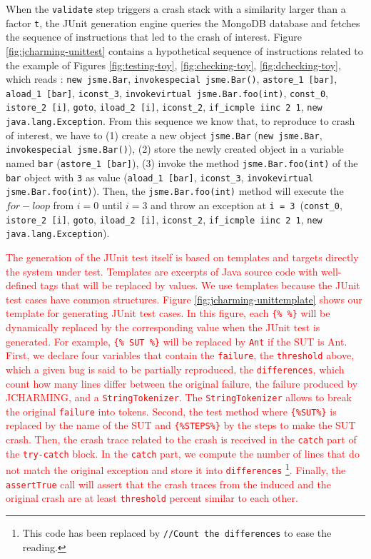 \documentclass[times, doublespace]{smrauth}
\newcommand{\red}[1]{\textcolor{red}{#1}}
\begin{document}
{When the {\tt validate} step triggers a crash stack with a similarity larger than a factor {\tt t}, the JUnit generation engine queries the MongoDB database and fetches the sequence of instructions that led to the crash of interest.
Figure \ref{fig:jcharming-unittest} contains a hypothetical sequence
of instructions related to the example of Figures \ref{fig:testing-toy},
\ref{fig:checking-toy}, \ref{fig:dchecking-toy}, which reads : {\tt new jsme.Bar},
 {\tt invokespecial jsme.Bar()}, {\tt astore\_1 [bar]}, {\tt aload\_1 [bar]},
  {\tt iconst\_3}, {\tt invokevirtual jsme.Bar.foo(int)}, {\tt const\_0},
  {\tt istore\_2 [i]}, {\tt goto}, {\tt iload\_2 [i]}, {\tt iconst\_2},
  {\tt if\_icmple iinc 2 1}, {\tt new java.lang.Exception}.
From this sequence we know that, to reproduce to crash of interest, we have
to (1) create a new object {\tt jsme.Bar} ({\tt new jsme.Bar},
{\tt invokespecial jsme.Bar()}), (2) store the newly created object in a
variable named {\tt bar} ({\tt astore\_1 [bar]}), (3) invoke the method
{\tt jsme.Bar.foo(int)} of the {\tt bar} object with {\tt 3} as value
({\tt aload\_1 [bar]}, {\tt iconst\_3}, {\tt invokevirtual jsme.Bar.foo(int)}).
Then, the {\tt jsme.Bar.foo(int)} method will execute the $for-loop$ from $i=0$ until $i=3$ and
throw an exception at {\tt i = 3}~({\tt const\_0}, {\tt istore\_2 [i]}, {\tt goto},
{\tt iload\_2 [i]}, {\tt iconst\_2}, {\tt if\_icmple iinc 2 1}, {\tt new java.lang.Exception}).

\red{The generation of the JUnit test itself is based on templates and targets directly
the system under test. Templates are excerpts of Java source code with well-defined
tags that will be replaced by values. We use templates because the
JUnit test cases have common structures.
Figure \ref{fig:jcharming-unittemplate} shows our template for generating JUnit
test cases. In this figure, each {\tt \{\% \%\}} will be dynamically replaced by
the corresponding value when the JUnit test is generated. For example, {\tt \{\% SUT \%\}}
will be replaced by {\tt Ant} if the SUT is Ant.
First, we declare four variables that contain the {\tt failure},
the {\tt threshold} above, which a given bug is said to be partially reproduced,
the {\tt differences}, which count how many lines differ between the original
failure, the failure produced by JCHARMING, and a {\tt StringTokenizer}.
The {\tt StringTokenizer} allows to break the original {\tt failure} into
tokens. Second, the test method where {\tt \{\%SUT\%\}} is replaced by the name
of the SUT and {\tt \{\%STEPS\%\}} by the steps to make the SUT crash.
Then, the crash trace related to the crash is received in the {\tt catch} part of
the {\tt try-catch} block. In the {\tt catch} part, we compute the number of lines
that do not match the original exception and store it into {\tt differences}
\footnote{This code has been replaced by {\tt //Count the differences} to ease the
reading.}. Finally, the {\tt assertTrue} call will assert that
the crash traces from the induced and the original crash are at least {\tt threshold}
 percent similar to each other.}


}
\end{document}
